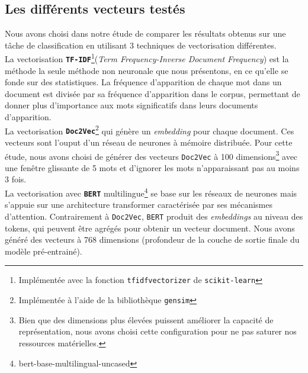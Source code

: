 \subsection{Les différents vecteurs testés}
Nous avons choisi dans notre étude de comparer les résultats obtenus sur une tâche 
de classification en utilisant 3 techniques de vectorisation différentes.\\
\indent La vectorisation \textbf{\texttt{TF-IDF}}\footnote{Implémentée avec la fonction \texttt{tfidfvectorizer} de \texttt{scikit-learn}}(\textit{Term Frequency-Inverse Document Frequency})
est la méthode la seule méthode non neuronale que nous présentons, en ce qu'elle se fonde sur des statistiques. La fréquence d'apparition de chaque mot dans un document est divisée par sa fréquence d'apparition dans le corpus,
permettant de donner plus d'importance aux mots significatifs dans leurs documents d'apparition.\\
\indent La vectorisation \textbf{\texttt{Doc2Vec}}\footnote{Implémentée à l'aide de la bibliothèque \texttt{gensim}} qui génère un \textit{embedding} pour chaque document. Ces vecteurs sont
l'ouput d'un réseau de neurones à mémoire distribuée. Pour cette étude,
nous avons choisi de générer des vecteurs \texttt{Doc2Vec} à 100 dimensions\footnote{Bien que des dimensions plus élevées puissent améliorer la capacité de représentation, nous avons choisi cette configuration pour ne pas saturer nos ressources matérielles.}
avec une fenêtre glissante de 5 mots et d'ignorer les mots n'apparaissant pas au moins 3 fois.\\
\indent La vectorisation avec \textbf{\texttt{BERT}} multilingue\footnote{bert-base-multilingual-uncased} se base sur les réseaux de neurones mais s'appuie sur une 
architecture transformer caractérisée par ses mécanismes d'attention. Contrairement à
\texttt{Doc2Vec}, \texttt{BERT} produit des \textit{embeddings} au niveau des tokens, qui peuvent être agrégés pour obtenir un vecteur document. Nous avons généré des vecteurs à 768 dimensions (profondeur de la couche de sortie finale du modèle pré-entrainé).





